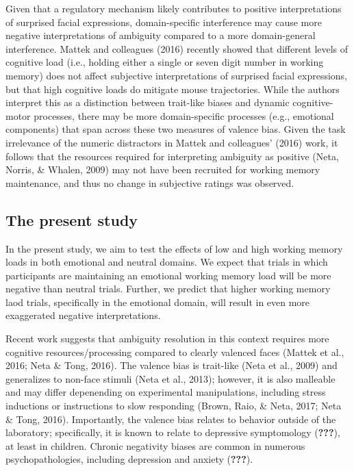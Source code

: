 \documentclass[man]{apa6}
\begin{document}
Given that a regulatory mechanism likely contributes to positive interpretations of surprised facial expressions, domain-specific interference may cause more negative interpretations of ambiguity compared to a more domain-general interference. Mattek and colleagues (2016) recently showed that different levels of cognitive load (i.e., holding either a single or seven digit number in working memory) does not affect subjective interpretations of surprised facial expressions, but that high cognitive loads do mitigate mouse trajectories. While the authors interpret this as a distinction between trait-like biases and dynamic cognitive-motor processes, there may be more domain-specific processes (e.g., emotional components) that span across these two measures of valence bias. Given the task irrelevance of the numeric distractors in Mattek and colleagues' (2016) work, it follows that the resources required for interpreting ambiguity as positive (Neta, Norris, \& Whalen, 2009) may not have been recruited for working memory maintenance, and thus no change in subjective ratings was observed.

\hypertarget{the-present-study}{%
\subsection{The present study}\label{the-present-study}}

In the present study, we aim to test the effects of low and high working memory loads in both emotional and neutral domains. We expect that trials in which participants are maintaining an emotional working memory load will be more negative than neutral trials. Further, we predict that higher working memory laod trials, specifically in the emotional domain, will result in even more exaggerated negative interpretations.

Recent work suggests that ambiguity resolution in this context requires more cognitive resources/processing compared to clearly valenced faces (Mattek et al., 2016; Neta \& Tong, 2016).
The valence bias is trait-like (Neta et al., 2009) and generalizes to non-face stimuli (Neta et al., 2013); however, it is also malleable and may differ depenending on experimental manipulations, including stress inductions or instructions to slow responding (Brown, Raio, \& Neta, 2017; Neta \& Tong, 2016). Importantly, the valence bias relates to behavior outside of the laboratory; specifically, it is known to relate to depressive symptomology ({\textbf{???}}), at least in children. Chronic negativity biases are common in numerous psychopathologies, including depression and anxiety ({\textbf{???}}).
\end{document}
